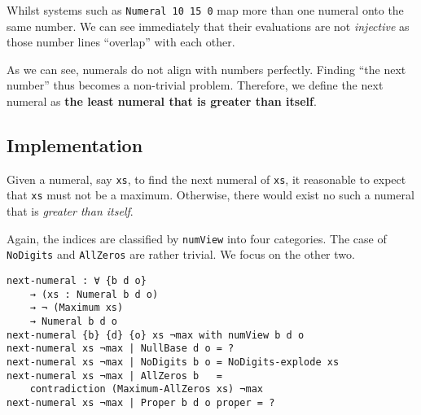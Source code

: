 \documentclass[\main/thesis.tex]{subfiles}
\begin{document}
Whilst systems such as {\lstinline|Numeral 10 15 0|} map more than one numeral
onto the same number. We can see immediately that their evaluations are not
\textit{injective} as those number lines ``overlap'' with each other.

\begin{center}
    \begin{adjustbox}{max width=\textwidth}
    \end{adjustbox}
\end{center}


As we can see, numerals do not align with numbers perfectly.
Finding ``the next number'' thus becomes a non-trivial problem.
Therefore, we define the next numeral as \textbf{the least numeral that is greater than itself}.

\subsection{Implementation}

Given a numeral, say {\lstinline|xs|}, to find the next numeral of {\lstinline|xs|},
it reasonable to expect that {\lstinline|xs|} must not be a maximum.
Otherwise, there would exist no such a numeral that is \textit{greater than itself}.

Again, the indices are classified by {\lstinline|numView|} into four categories.
The case of {\lstinline|NoDigits|} and {\lstinline|AllZeros|} are rather trivial.
We focus on the other two.

\begin{lstlisting}
next-numeral : ∀ {b d o}
    → (xs : Numeral b d o)
    → ¬ (Maximum xs)
    → Numeral b d o
next-numeral {b} {d} {o} xs ¬max with numView b d o
next-numeral xs ¬max | NullBase d o = ?
next-numeral xs ¬max | NoDigits b o = NoDigits-explode xs
next-numeral xs ¬max | AllZeros b   =
    contradiction (Maximum-AllZeros xs) ¬max
next-numeral xs ¬max | Proper b d o proper = ?
\end{lstlisting}
\end{document}
